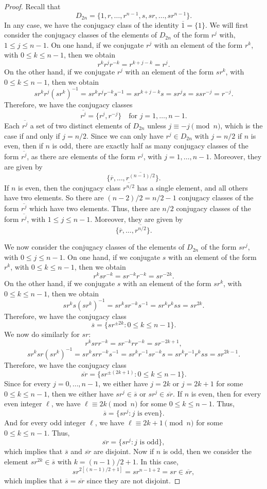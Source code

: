 \documentclass[12pt]{article}
\newcommand{\<}{\left\langle} %
\renewcommand{\>}{\right\rangle} %
\let\eqc\overline %
\begin{document}
\begin{proof}
    Recall that
    \[D_{2n} = \{1, r, \dots, r^{n-1}, s, sr, \dots, sr^{n-1}\}.\]
    In any case, we have the conjugacy class of the identity $\eqc{1}=\{1\}$. We will first consider the conjugacy classes of the elements of $D_{2n}$ of the form $r^j$ with, $1 \leq j \leq n-1$. On one hand, if we conjugate $r^j$ with an element of the form $r^k$, with $0 \leq k \leq n-1$, then we obtain
    \[r^kr^jr^{-k} = r^{k + j - k} = r^j.\]
    On the other hand, if we conjugate $r^j$ with an element of the form $sr^k$, with $0 \leq k \leq n-1$, then we obtain
    \[sr^kr^j(sr^k)^{-1} = sr^kr^jr^{-k}s^{-1} = sr^{k + j - k}s = sr^js = ssr^{-j} = r^{-j}.\]
    Therefore, we have the conjugacy classes
    \[\eqc{r^j} = \{r^{j}, r^{-j}\} \quad\text{for $j=1,\dots,n-1$.}\]
    Each $\eqc{r^j}$ a set of two distinct elements of $D_{2n}$ unless $j \equiv -j \pmod{n}$, which is the case if and only if $j = n/2$. Since we can only have $r^j\in D_{2n}$ with $j=n/2$ if $n$ is even, then if $n$ is odd, there are exactly half as many conjugacy classes of the form $\eqc{r^j}$, as there are elements of the form $r^j$, with $j=1,\dots,n-1$. Moreover, they are given by
    \[\{\eqc{r}, \dots, \eqc{r^{(n-1)/2}}\}.\]
    If $n$ is even, then the conjugacy class $\eqc{r^{n/2}}$ has a single element, and all others have two elements. So there are $(n-2)/2 = n/2 - 1$ conjugacy classes of the form $\eqc{r^j}$ which have two elements. Thus, there are $n/2$ conjugacy classes of the form $\eqc{r^j}$, with $1 \leq j \leq n-1$. Moreover, they are given by
    \[\{\eqc{r}, \dots, \eqc{r^{n/2}}\}.\]
    
    We now consider the conjugacy classes of the elements of $D_{2n}$ of the form $sr^{j}$, with $0\leq j \leq n-1$. On one hand, if we conjugate $s$ with an element of the form $r^k$, with $0 \leq k \leq n-1$, then we obtain
    \[r^ksr^{-k} = sr^{-k}r^{-k} = sr^{-2k}.\]
    On the other hand, if we conjugate $s$ with an element of the form $sr^k$, with $0 \leq k \leq n-1$, then we obtain
    \[sr^ks(sr^{k})^{-1} = sr^ksr^{-k}s^{-1} = sr^kr^kss = sr^{2k}.\]
    Therefore, we have the conjugacy class
    \[\eqc{s} = \{sr^{\pm2k} : 0 \leq k \leq n-1\}.\]
    We now do similarly for $sr$:
    \[r^ksrr^{-k} = sr^{-k}rr^{-k} = sr^{-2k+1},\]
    \[sr^ksr(sr^{k})^{-1} = sr^ksrr^{-k}s^{-1} = sr^kr^{-1}sr^{-k}s = sr^kr^{-1}r^kss  = sr^{2k-1}.\]
    Therefore, we have the conjugacy class
    \[\eqc{sr} = \{sr^{\pm(2k+1)} : 0 \leq k \leq n-1\}.\]
    Since for every $j=0,\dots,n-1$, we either have $j = 2k$ or $j = 2k+1$ for some $0\leq k \leq n-1$, then we either have $sr^j \in \eqc{s}$ or $sr^j \in \eqc{sr}$. If $n$ is even, then for every even integer $\ell$, we have $\ell \equiv 2k \pmod{n}$ for some $0 \leq k \leq n-1$. Thus, 
    \[\eqc{s} = \{sr^j : \text{$j$ is even}\}.\]
    And for every odd integer $\ell$, we have $\ell \equiv 2k + 1 \pmod{n}$ for some $0 \leq k \leq n-1$. Thus,
    \[\eqc{sr} = \{sr^j : \text{$j$ is odd}\},\]
    which implies that $\eqc{s}$ and $\eqc{sr}$ are disjoint. Now if $n$ is odd, then we consider the element $sr^{2k}\in\eqc{s}$ with $k=(n-1)/2 + 1$. In this case,
    \[sr^{2[(n-1)/2 + 1]} = sr^{n-1 + 2} = sr \in \eqc{sr},\]
    which implies that $\eqc{s} = \eqc{sr}$ since they are not disjoint.
    

\end{proof}
\end{document}
